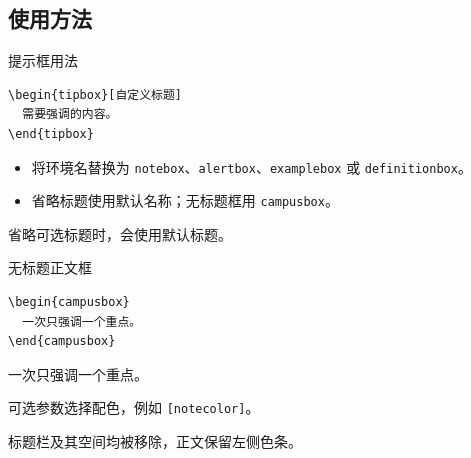 \subsection{使用方法}

\begin{frame}[fragile]{提示框用法}
      \begin{verbatim}
\begin{tipbox}[自定义标题]
  需要强调的内容。
\end{tipbox}
      \end{verbatim}
      \begin{itemize}
            \item 将环境名替换为 \texttt{notebox}、\texttt{alertbox}、\texttt{examplebox} 或 \texttt{definitionbox}。
            \item 省略标题使用默认名称；无标题框用 \texttt{campusbox}。
      \end{itemize}
      \begin{tipbox}
            省略可选标题时，会使用默认标题。
      \end{tipbox}
\end{frame}


\begin{frame}[fragile]{无标题正文框}
  \begin{verbatim}
\begin{campusbox}
  一次只强调一个重点。
\end{campusbox}
  \end{verbatim}
  \begin{campusbox}
    一次只强调一个重点。
  \end{campusbox}
  \begin{campusbox}[notecolor]
    可选参数选择配色，例如 \texttt{[notecolor]}。
  \end{campusbox}
  \begin{campusbox}[alertcolor]
    标题栏及其空间均被移除，正文保留左侧色条。
  \end{campusbox}
\end{frame}
